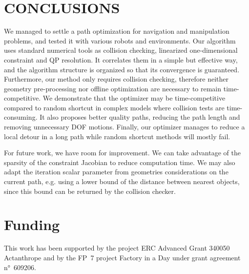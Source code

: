 \documentclass{tADR2e}
\begin{document}
\section{CONCLUSIONS}
We managed to settle a path optimization for navigation and manipulation problems, and tested it with various robots and environments. Our algorithm uses standard 
numerical tools as collision checking, linearized one-dimensional constraint
and QP resolution. It correlates them in a 
simple but effective way, and the algorithm structure is organized so that its 
convergence is guaranteed. Furthermore, 
our method only requires collision checking, therefore neither 
geometry pre-processing nor 
offline optimization are necessary to remain time-competitive. We demonstrate 
that the optimizer may be 
time-competitive compared to random shortcut in complex models where collision tests 
are time-consuming. 
It also proposes better quality paths, reducing the path length and removing 
unnecessary DOF motions. 
Finally, our optimizer manages to reduce a local detour in a long path while random 
shortcut methods will mostly fail.

For future work, we have room for improvement. We can take advantage of the sparsity of 
the constraint Jacobian to reduce computation time. We may also adapt the iteration 
scalar parameter from geometries considerations on the current path, e.g. using a lower 
bound of the distance between nearest objects, since this bound can be returned by 
the collision checker.

\section*{Funding}
This work has been supported by the project ERC Advanced Grant 340050 Actanthrope and by the FP~7 project Factory in a Day under grant agreement n°~609206.
\end{document}
